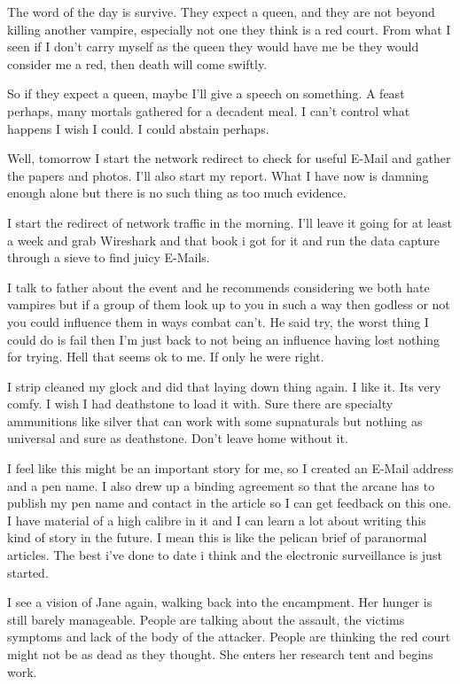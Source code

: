 The word of the day is survive. They expect a queen, and they are not beyond killing another vampire, especially not one they think is a red court. From what I seen if I don't carry myself as the queen they would have me be they would consider me a red, then death will come swiftly.

So if they expect a queen, maybe I'll give a speech on something. A feast perhaps, many mortals gathered for a decadent meal. I can't control what happens I wish I could. I could abstain perhaps.

Well, tomorrow I start the network redirect to check for useful E-Mail and gather the papers and photos. I'll also start my report. What I have now is damning enough alone but there is no such thing as too much evidence.

I start the redirect of network traffic in the morning. I'll leave it going for at least a week and grab Wireshark and that book i got for it and run the data capture through a sieve to find juicy E-Mails.

I talk to father about the event and he recommends considering we both hate vampires but if a group of them look up to you in such a way then godless or not you could influence them in ways combat can't. He said try, the worst thing I could do is fail then I'm just back to not being an influence having lost nothing for trying. Hell that seems ok to me. If only he were right.

I strip cleaned my glock and did that laying down thing again. I like it. Its very comfy. I wish I had deathstone to load it with. Sure there are specialty ammunitions like silver that can work with some supnaturals but nothing as universal and sure as deathstone. Don't leave home without it.

I feel like this might be an important story for me, so I created an E-Mail address and a pen name. I also drew up a binding agreement so that the arcane has to publish my pen name and contact in the article so I can get feedback on this one. I have material of a high calibre in it and I can learn a lot about writing this kind of story in the future. I mean this is like the pelican brief of paranormal articles. The best i've done to date i think and the electronic surveillance is just started.

I see a vision of Jane again, walking back into the encampment. Her hunger is still barely manageable. People are talking about the assault, the victims symptoms and lack of the body of the attacker. People are thinking the red court might not be as dead as they thought. She enters her research tent and begins work.

